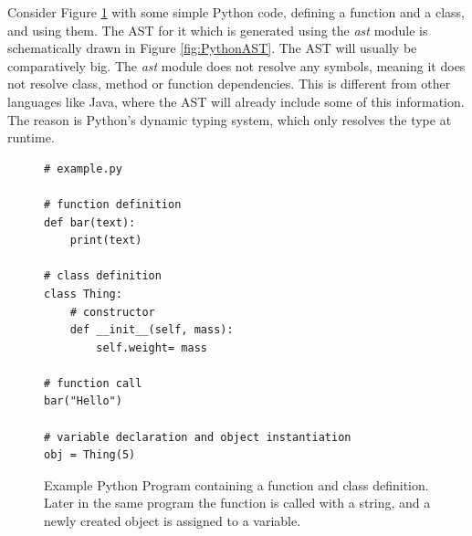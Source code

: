 \documentclass[a4paper,11pt,twoside]{article}
\theoremstyle{definition} %
\begin{document}
Consider Figure \ref{figure:exPyProg} with some simple Python code, defining a function and a class, and using them. The AST for it which is generated using the \textit{ast} module is schematically drawn in Figure \ref{fig:PythonAST}. The AST will usually be comparatively big. The \textit{ast} module does not resolve any symbols, meaning it does not resolve class, method or function dependencies. This is different from other languages like Java, where the AST will already include some of this information. The reason is Python’s dynamic typing system, which only resolves the type at runtime.

\begin{figure}[h]
    \begin{lstlisting}
# example.py

# function definition
def bar(text):
    print(text)

# class definition
class Thing:
    # constructor
    def __init__(self, mass):
        self.weight= mass

# function call
bar("Hello") 

# variable declaration and object instantiation
obj = Thing(5)
    \end{lstlisting}
    \caption{Example Python Program containing a function and class definition. Later in the same program the function is called with a string, and a newly created object is assigned to a variable.}
    \label{figure:exPyProg}
\end{figure}
\end{document}
